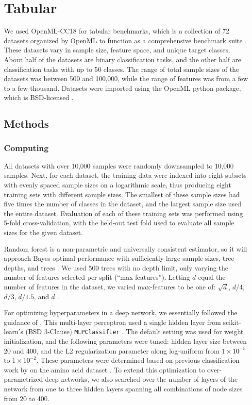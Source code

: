 \section{Tabular}
\label{tabular}
We used OpenML-CC18 for tabular benchmarks, which is a collection of 72 datasets organized by OpenML to function as a comprehensive benchmark suite \citep{OpenML2013, bischl}. These datasets vary in sample size, feature space, and unique target classes.
About half of the datasets are binary classification tasks, and the other half are classification tasks with up to 50 classes. The range of total sample sizes of the datasets was between 500 and 100,000, while the range of features was from a few to a few thousand.
Datasets were imported using the OpenML python package, which is BSD-licensed \citep{OpenMLPython2019}.

\subsection{Methods}
\subsubsection{Computing}
All datasets with over 10,000 samples were randomly downsampled to 10,000 samples. Next, for each dataset, the training data were indexed into eight subsets with evenly spaced sample sizes on a logarithmic scale, thus producing eight training sets with different sample sizes. The smallest of these sample sizes had five times the number of classes in the dataset, and the largest sample size used the entire dataset.
Evaluation of each of these training sets was performed using 5-fold cross-validation, with the held-out test fold used to evaluate all sample sizes for the given dataset.

Random forest is a non-parametric and universally consistent estimator, so it will approach Bayes optimal performance with sufficiently large sample sizes, tree depths, and trees \citep{biau}.
We used 500 trees with no depth limit, only varying the number of features selected per split (``max-features'').
Letting $d$ equal the number of features in the dataset, we varied max-features to be one of: $\sqrt{d}$, $d/4$, $d/3$, $d/1.5$, and $d$ \citep{parameter}.

For optimizing hyperparameters in a deep network, we essentially followed the guidance of \citet{bouthillier}. This multi-layer perceptron used a single hidden layer from scikit-learn's (BSD 3-Clause) \texttt{MLPClassifier} \citep{scikit-learn}. The default setting was used for weight initialization, and the following parameters were tuned: hidden layer size between 20 and 400, and the L2 regularization parameter along log-uniform from $1 \times 10^{-5}$ to $1 \times 10^{-2}$. These parameters were determined based on previous classification work by \citet{jurtz} on the amino acid dataset \citep{MHC}.
To extend this optimization to over-parametrized deep networks, we also searched over the number of layers of the network from one to three hidden layers spanning all combinations of node sizes from 20 to 400. 

